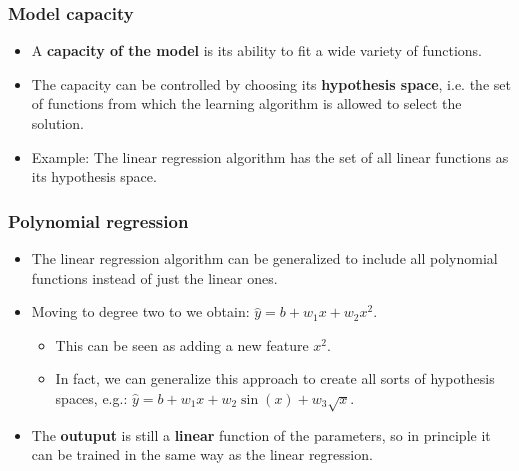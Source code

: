 \documentclass[notes]{beamer}          %
\newif\iffull
\begin{document}
\begin{frame}
\frametitle{Model capacity}
    \begin{itemize}
        \item A {\bf capacity of the model} is its ability to fit a wide variety of functions.
        \iffull
        \item Low capacity models struggle to fit the training set (underfitting).
        \item Models with high capacity have danger to overfit the training data (e.g., by ``memorizing'' training samples).
        \fi
        \item The capacity can be controlled by choosing its {\bf hypothesis space}, i.e. the set of functions from which the learning algorithm is allowed to select the solution.
        \item Example: The linear regression algorithm has the set of all linear functions as its hypothesis space.

    \end{itemize}
\end{frame}


\begin{frame}
\frametitle{Polynomial regression}
    \begin{itemize}
        \item The linear regression algorithm can be generalized to include all polynomial functions instead of just the linear ones.
        \iffull
        \item The linear regression model is then just a special case restricted to a polynomial of degree one: $\hat{y} = b + wx$.
        \fi
        \item Moving to degree two to we obtain: $\hat{y} = b + w_1 x + w_2 x^2$.
        \begin{itemize}
            \item This can be seen as adding a new feature $x^2$.
            \item In fact, we can generalize this approach to create all sorts of hypothesis spaces, e.g.: $\hat{y} = b + w_1 x + w_2 \sin{(x)} + w_3 \sqrt{x}$.
        \end{itemize}
        \item The {\bf outuput} is still a {\bf linear} function of the parameters, so in principle it can be trained in the same way as the linear regression.
    \end{itemize}
\end{frame}
\end{document}
